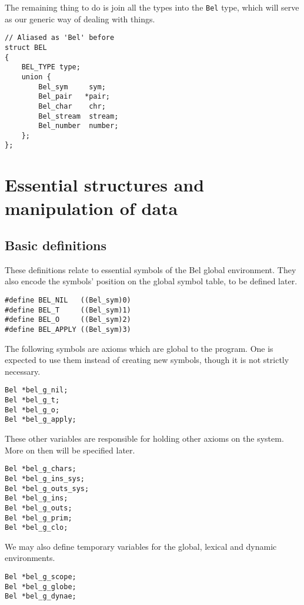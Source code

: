 \documentclass[openright,a4paper,twoside,12pt]{memoir}
\begin{document}
The remaining thing to do is join all the types into the \texttt{Bel} type,
which will serve as our generic way of dealing with things.

\begin{verbatim}
// Aliased as 'Bel' before
struct BEL
{
    BEL_TYPE type;
    union {
        Bel_sym     sym;
        Bel_pair   *pair;
        Bel_char    chr;
        Bel_stream  stream;
        Bel_number  number;
    };
};
\end{verbatim}

\chapter{Essential structures and manipulation of data}
\label{sec:org95caa07}
\section{Basic definitions}
\label{sec:org9dfbaab}

These definitions relate to essential symbols of the Bel global
environment. They also encode the symbols' position on the global
symbol table, to be defined later.

\begin{verbatim}
#define BEL_NIL   ((Bel_sym)0)
#define BEL_T     ((Bel_sym)1)
#define BEL_O     ((Bel_sym)2)
#define BEL_APPLY ((Bel_sym)3)
\end{verbatim}

The following symbols are axioms which are global to the program. One
is expected to use them instead of creating new symbols, though it is
not strictly necessary.

\begin{verbatim}
Bel *bel_g_nil;
Bel *bel_g_t;
Bel *bel_g_o;
Bel *bel_g_apply;
\end{verbatim}

These other variables are responsible for holding other axioms on the
system. More on then will be specified later.

\begin{verbatim}
Bel *bel_g_chars;
Bel *bel_g_ins_sys;
Bel *bel_g_outs_sys;
Bel *bel_g_ins;
Bel *bel_g_outs;
Bel *bel_g_prim;
Bel *bel_g_clo;
\end{verbatim}

We may also define temporary variables for the global, lexical and
dynamic environments.

\begin{verbatim}
Bel *bel_g_scope;
Bel *bel_g_globe;
Bel *bel_g_dynae;
\end{verbatim}
\end{document}
